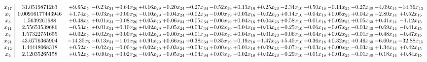 \documentclass[9pt]{article}
\begin{document}
 \[\begin{array}{c| c c@{\hskip 2pt} c@{\hskip 2pt} c@{\hskip 2pt} c@{\hskip 2pt} c@{\hskip 2pt} c@{\hskip 2pt} c@{\hskip 2pt} c@{\hskip 2pt} c@{\hskip 2pt} c@{\hskip 2pt} c@{\hskip 2pt} c@{\hskip 2pt} c@{\hskip 2pt} c@{\hskip 2pt} c@{\hskip 2pt} }
 x_{17}   &  31.0519871263 & +  9.65 x_{5} & -0.23 x_{31} & +  0.64 x_{26} & +  0.16 x_{29} & -0.20 x_{24} & -0.27 x_{34} & -0.52 x_{19} & +  0.13 x_{16} & +  0.25 x_{23} & -2.34 x_{10} & -0.50 x_{18} & -0.11 x_{25} & -0.27 x_{30} & -4.09 x_{14} & -14.36 x_{15}\\
 x_{7}   &  0.00916177443946 & +  1.74 x_{5} & -0.03 x_{31} & +  0.00 x_{26} & -0.10 x_{29} & -0.04 x_{24} & +  0.02 x_{34} & -0.00 x_{19} & +  0.03 x_{16} & -0.02 x_{23} & +  0.14 x_{10} & -0.04 x_{18} & +  0.05 x_{25} & +  0.04 x_{30} & -2.80 x_{14} & +  0.52 x_{15}\\
 x_{3}   &  1.5639261688 & +  0.48 x_{5} & +  0.01 x_{31} & -0.08 x_{26} & +  0.05 x_{29} & +  0.06 x_{24} & +  0.05 x_{34} & -0.06 x_{19} & +  0.04 x_{16} & +  0.04 x_{23} & +  0.58 x_{10} & -0.01 x_{18} & +  0.02 x_{25} & +  0.05 x_{30} & +  0.41 x_{14} & -1.12 x_{15}\\
 x_{11}   &  2.55653539686 & -0.53 x_{5} & +  0.01 x_{31} & +  0.10 x_{26} & +  0.02 x_{29} & -0.05 x_{24} & -0.03 x_{34} & -0.02 x_{19} & -0.04 x_{16} & -0.03 x_{23} & -0.25 x_{10} & -0.06 x_{18} & -0.07 x_{25} & -0.03 x_{30} & -0.69 x_{14} & -0.41 x_{15}\\
 x_{8}   &  1.57322751655 & +  0.02 x_{5} & +  0.02 x_{31} & +  0.00 x_{26} & +  0.02 x_{29} & -0.00 x_{24} & +  0.01 x_{34} & -0.04 x_{19} & +  0.04 x_{16} & -0.01 x_{23} & -0.06 x_{10} & -0.04 x_{18} & +  0.02 x_{25} & -0.01 x_{30} & -0.48 x_{14} & -0.47 x_{15}\\
 x_{21}   &  43.6776365904 & -14.35 x_{5} & -0.13 x_{31} & -1.01 x_{26} & +  0.91 x_{29} & +  0.66 x_{24} & +  0.38 x_{34} & -0.85 x_{19} & -0.19 x_{16} & -1.47 x_{23} & +  5.45 x_{10} & -0.36 x_{18} & +  0.32 x_{25} & +  0.46 x_{30} & -6.60 x_{14} & -32.88 x_{15}\\
 x_{12}   &  1.44448068318 & +  0.52 x_{5} & -0.02 x_{31} & -0.00 x_{26} & +  0.02 x_{29} & +  0.03 x_{24} & +  0.03 x_{34} & +  0.00 x_{19} & +  0.01 x_{16} & +  0.09 x_{23} & -0.07 x_{10} & +  0.03 x_{18} & +  0.00 x_{25} & -0.03 x_{30} & +  1.34 x_{14} & +  0.42 x_{15}\\
 x_{4}   &  2.12035265158 & +  0.52 x_{5} & +  0.00 x_{31} & +  0.02 x_{26} & -0.05 x_{29} & -0.05 x_{24} & -0.04 x_{34} & +  0.03 x_{19} & -0.02 x_{16} & +  0.02 x_{23} & -0.29 x_{10} & -0.01 x_{18} & +  0.01 x_{25} & -0.01 x_{30} & -0.18 x_{14} & +  0.84 x_{15}\\

\end{array}\]
\end{document}
